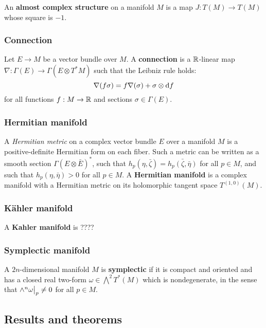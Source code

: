 \documentclass[11pt, english]{article}
\begin{document}
An \textbf{almost complex structure} on a manifold $M$ is a map $J:T(M) \to T(M)$ whose square is $-1$.

\subsubsection{Connection}
\label{connection}
Let $E \to M$ be a vector bundle over $M$. A \textbf{connection} is a $\mathbb{R}$-linear map $\nabla:\Gamma(E) \to \Gamma(E \otimes T^\ast M)$ such that the Leibniz rule holds:
\[
\nabla(f \sigma) = f \nabla(\sigma) + \sigma \otimes \mathrm{d}{f}
\]
for all functions $f:M \to \mathbb{R}$ and sections $\sigma \in \Gamma(E)$.

\subsubsection{Hermitian manifold}
\label{hermitianmanifold}

A \emph{Hermitian metric} on a complex vector bundle $E$ over a manifold $M$ is a positive-definite Hermitian form on each fiber. Such a metric can be written as a smooth section $\Gamma(E \otimes \bar{E})^\ast$, such that $h_p(\eta, \bar{\zeta}) = \bar{h_p\left(\zeta,\bar{\eta}\right)}$ for all $p \in M$, and such that $h_p(\eta,\bar{\eta}) > 0$ for all $p \in M$. A \textbf{Hermitian manifold} is a complex manifold with a Hermitian metric on its holomorphic tangent space $T^{(1,0)}(M)$.

\subsubsection{Kähler manifold}
\label{kahlermanifold}

A \textbf{Kahler manifold} is ????

\subsubsection{Symplectic manifold}
\label{symplectic}

A $2n$-dimensional manifold $M$ is \textbf{symplectic} if it is compact and oriented and has a closed real two-form $\omega \in \bigwedge^2 T^\ast(M)$ which is nondegenerate, in the sense that $\restr{\wedge^n \omega}{p} \neq 0$ for all $p \in M$.

\subsection{Results and theorems}



\end{document}
